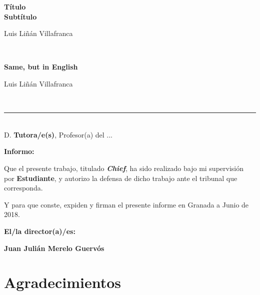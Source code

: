 \thispagestyle{empty}

\begin{center}
    {\large\bfseries Título \\ Subtítulo }\\
\end{center}
\begin{center}
    Luis Liñán Villafranca \\
\end{center}

\vspace{0.7cm}

\vspace{0.5cm}
\vspace{0.7cm}

\\

\cleardoublepage

\begin{center}
    {\large\bfseries Same, but in English}\\
\end{center}
\begin{center}
    Luis Liñán Villafranca\\
\end{center}
\vspace{0.5cm}
\vspace{0.7cm}

\\


\cleardoublepage

\thispagestyle{empty}

\noindent\rule[-1ex]{\textwidth}{2pt}\\[4.5ex]

D. \textbf{Tutora/e(s)}, Profesor(a) del ...

\vspace{0.5cm}

\textbf{Informo:}

\vspace{0.5cm}

Que el presente trabajo, titulado \textit{\textbf{Chief}}, ha sido realizado
bajo mi supervisión por \textbf{Estudiante}, y autorizo la defensa de dicho
trabajo ante el tribunal que corresponda.

\vspace{0.5cm}

Y para que conste, expiden y firman el presente informe en Granada a Junio de
2018.

\vspace{1cm}

\textbf{El/la director(a)/es:}

\vspace{5cm}

\noindent\textbf{Juan Julián Merelo Guervós}

\chapter*{Agradecimientos}




